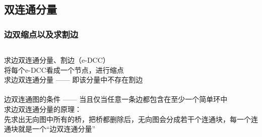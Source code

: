 \documentclass[twoside]{article}
\begin{document}
\subsection{双连通分量}
\subsubsection{边双缩点以及求割边}
\begin{lstlisting}
\end{lstlisting}
求边双连通分量、割边（e-DCC）\\
\quad 将每个e-DCC看成一个节点，进行缩点\\
\quad 求边双连通分量 —— 即该分量中不存在割边\\
\\ 
边双连通图的条件 —— 当且仅当任意一条边都包含在至少一个简单环中\\
求边双连通分量的原理：\\
\quad 先求出无向图中所有的桥，把桥都删除后，无向图会分成若干个连通块，每一个连通块就是一个“边双连通分量”\\
\end{document}
